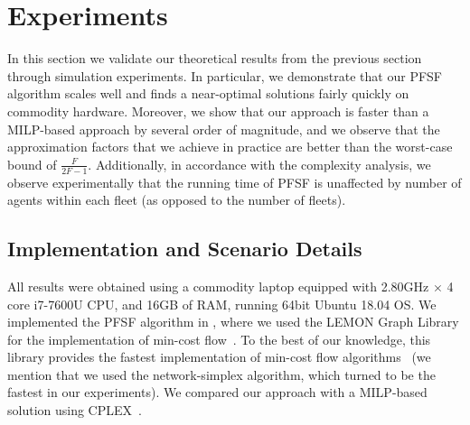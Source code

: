 \documentclass[conference]{IEEEtran}
\begin{document}

\section{Experiments}\label{sec:experiments}
In this section we validate our theoretical results from the previous section through simulation experiments. In particular, we demonstrate that our PFSF algorithm  scales well and finds a near-optimal solutions fairly quickly on commodity hardware. Moreover, we show that our approach is faster than a MILP-based approach by several order of magnitude, and we observe that the approximation factors that we achieve in practice are better than the worst-case bound of $\frac{F}{2F-1}$. Additionally, in accordance with the complexity analysis, we observe experimentally that the running time of PFSF is unaffected by number of agents within each fleet (as opposed to the number of fleets).

\subsection{Implementation and Scenario Details}
All results were obtained using a commodity laptop equipped with 2.80GHz $\times$ 4 core i7-7600U CPU, and 16GB of RAM, running 64bit Ubuntu 18.04 OS. We implemented the PFSF algorithm in \cpp, where we used the LEMON Graph Library for the implementation of min-cost flow~\cite{Lemon}. To the best of our knowledge, this library provides the fastest implementation of min-cost flow algorithms~\cite{Kovacs15} (we mention that we used the network-simplex algorithm, which turned to be the fastest in our experiments). We compared our approach with a MILP-based solution using CPLEX~\cite{Cplex}.
\end{document}
